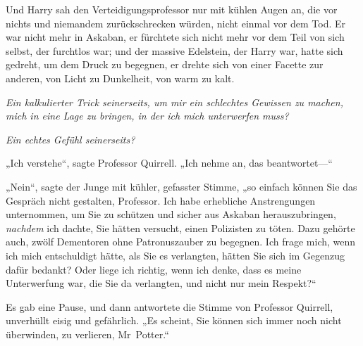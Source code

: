 Und Harry sah den Verteidigungsprofessor nur mit kühlen Augen an, die vor nichts und niemandem zurückschrecken würden, nicht einmal vor dem Tod. Er war nicht mehr in Askaban, er fürchtete sich nicht mehr vor dem Teil von sich selbst, der furchtlos war; und der massive Edelstein, der Harry war, hatte sich gedreht, um dem Druck zu begegnen, er drehte sich von einer Facette zur anderen, von Licht zu Dunkelheit, von warm zu kalt.

\emph{Ein kalkulierter Trick seinerseits, um mir ein schlechtes Gewissen zu machen, mich in eine Lage zu bringen, in der ich mich unterwerfen muss?}

\emph{Ein echtes Gefühl seinerseits?}

„Ich verstehe“, sagte Professor Quirrell. „Ich nehme an, das beantwortet—“

„Nein“, sagte der Junge mit kühler, gefasster Stimme, „so einfach können Sie das Gespräch nicht gestalten, Professor. Ich habe erhebliche Anstrengungen unternommen, um Sie zu schützen und sicher aus Askaban herauszubringen, \emph{nachdem} ich dachte, Sie hätten versucht, einen Polizisten zu töten. Dazu gehörte auch, zwölf Dementoren ohne Patronuszauber zu begegnen. Ich frage mich, wenn ich mich entschuldigt hätte, als Sie es verlangten, hätten Sie sich im Gegenzug dafür bedankt? Oder liege ich richtig, wenn ich denke, dass es meine Unterwerfung war, die Sie da verlangten, und nicht nur mein Respekt?“

Es gab eine Pause, und dann antwortete die Stimme von Professor Quirrell, unverhüllt eisig und gefährlich. „Es scheint, Sie können sich immer noch nicht überwinden, zu verlieren, Mr~Potter.“

